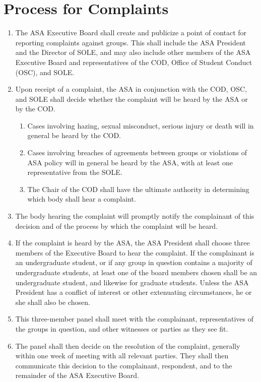 \documentclass[12pt]{constitution}
\begin{document}
\section{Process for Complaints}
\label{asa_jud_complaint_process}

\begin{enumerate}
    \item The ASA Executive Board shall create and publicize a point of contact for reporting complaints
        against groups.
    This shall include the ASA President and the Director of SOLE, and may also include other members of
        the ASA Executive Board and representatives of the COD, Office of Student Conduct (OSC), and SOLE.
    
    \item Upon receipt of a complaint, the ASA in conjunction with the COD, OSC, and SOLE shall
        decide whether the complaint will be heard by the ASA or by the COD.
    \begin{enumerate}
        \item Cases involving hazing, sexual misconduct, serious injury or death will in general
            be heard by the COD.
        \item Cases involving breaches of agreements between groups or violations of ASA policy
            will in general be heard by the ASA, with at least one representative from the SOLE.
        \item The Chair of the COD shall have the ultimate authority in determining which body
            shall hear a complaint.
    \end{enumerate}

    \item The body hearing the complaint will promptly notify the complainant of this decision and of
        the process by which the complaint will be heard.
    \item If the complaint is heard by the ASA, the ASA President shall choose three members of the
        Executive Board to hear the complaint.
    If the complainant is an undergraduate student, or if any group in question contains a majority of
        undergraduate students, at least one of the board members chosen shall be an undergraduate student,
        and likewise for graduate students.
    Unless the ASA President has a conflict of interest or other extenuating circumstances, he or she shall
        also be chosen.
    
    \item This three-member panel shall meet with the complainant, representatives of the groups in question,
        and other witnesses or parties as they see fit.
    \item The panel shall then decide on the resolution of the complaint, generally within one week of meeting
        with all relevant parties.
    They shall then communicate this decision to the complainant, respondent, and to the remainder of the ASA Executive Board.
\end{enumerate}
\end{document}
